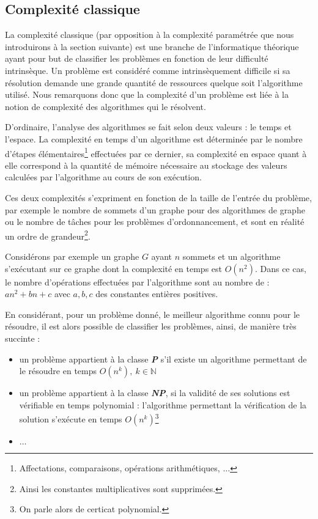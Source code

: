 \documentclass[a4paper,11pt]{report}
\begin{document}
\subsection{Complexité classique}

La complexité classique (par opposition à la complexité paramétrée que nous introduirons à la
section suivante) est une branche de l'informatique théorique ayant pour but de classifier les
problèmes en fonction de leur difficulté intrinsèque.  Un problème est considéré comme
intrinsèquement difficile si sa résolution demande une grande quantité de ressources quelque soit
l'algorithme utilisé. Nous remarquons donc que la complexité d'un problème est liée à la notion de
complexité des algorithmes qui le résolvent.

D'ordinaire, l'analyse des algorithmes se fait selon deux valeurs : le temps et l'espace. La
complexité en temps d'un algorithme est déterminée par le nombre d'étapes
élémentaires\footnote{Affectations, comparaisons, opérations arithmétiques, $\dots$} effectuées par
ce dernier, sa complexité en espace quant à elle correspond à la quantité de mémoire nécessaire au
stockage des valeurs calculées par l'algorithme au cours de son exécution.

Ces deux complexités s'expriment en fonction de la taille de l'entrée du problème, par exemple le
nombre de sommets d'un graphe pour des algorithmes de graphe ou le nombre de tâches pour les
problèmes d'ordonnancement, et sont en réalité un ordre de grandeur\footnote{Ainsi les constantes
multiplicatives sont supprimées.}. 

Considérons par exemple un graphe $G$ ayant $n$ sommets et un
algorithme s'exécutant sur ce graphe dont la complexité en temps est $O(n^2)$. Dans ce cas, le
nombre d'opérations effectuées par l'algorithme sont au nombre de : $an^2 + bn +c$ avec $a,b,c$ des
constantes entières positives.

En considérant, pour un problème donné, le meilleur algorithme connu pour le résoudre, il est alors
possible de classifier les problèmes, ainsi, de manière très succinte :
\begin{itemize}
    \item un problème appartient à la classe \textit{\textbf{P}} s'il existe un algorithme
        permettant de le résoudre en temps $O(n^k),\ k \in \mathbb{N}$
    \item un problème appartient à la classe \textit{\textbf{NP}}, si la validité de ses
        solutions est vérifiable en temps polynomial : l'algorithme permettant la vérification de la
        solution s'exécute en temps $O(n^k)$\footnote{On parle alors de certicat
        polynomial.}
    \item $\dots$
\end{itemize}
\end{document}

